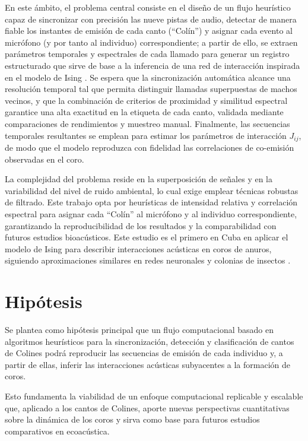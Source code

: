 En este ámbito, el problema central consiste en el diseño de 
un flujo heurístico 
capaz de sincronizar con precisión las nueve pistas de audio, 
detectar de manera fiable los instantes de emisión de cada 
canto (“Colín”) y asignar cada evento al micrófono (y por tanto 
al individuo) correspondiente; a partir de ello, se extraen 
parámetros temporales y espectrales de cada llamado para 
generar un registro estructurado que sirve de base a la 
inferencia de una red de interacción inspirada en el modelo de 
Ising \cite{ising1925beitrag}. Se espera que la sincronización 
automática alcance una resolución temporal tal que permita 
distinguir llamadas superpuestas de machos vecinos, y que la 
combinación de criterios de proximidad y similitud espectral 
garantice una alta exactitud en la etiqueta de cada canto, 
validada mediante comparaciones de rendimientos y muestreo manual. Finalmente, las secuencias 
temporales resultantes se emplean para estimar los parámetros 
de interacción \(J_{ij}\), de modo que el modelo reproduzca 
con fidelidad las correlaciones de co-emisión observadas en el 
coro.  


La complejidad del problema reside en la superposición de 
señales y en la variabilidad del nivel de ruido ambiental, lo 
cual exige emplear técnicas robustas de filtrado. 
Este trabajo opta por heurísticas 
de intensidad relativa y correlación espectral para asignar cada “Colín” al micrófono y 
al individuo correspondiente, garantizando 
la reproducibilidad de los resultados y la comparabilidad con 
futuros estudios bioacústicos. Este estudio es el primero en 
Cuba en aplicar el modelo de Ising para describir 
interacciones acústicas en coros de anuros, siguiendo 
aproximaciones similares en redes 
neuronales y colonias de insectos \cite{schneidman2006weak,mora2011biological,bialek2012biophysics,reyes2019transmission,ising1925beitrag}.

\section{Hipótesis}
\label{sec:hipotesis}

Se plantea como hipótesis principal que un flujo computacional 
basado en algoritmos heurísticos para la sincronización, 
detección y clasificación de cantos de Colines podrá reproducir 
las secuencias de emisión de cada individuo 
y, a partir de ellas, inferir las interacciones acústicas 
subyacentes a la formación de coros. 


Esto fundamenta la 
viabilidad de un enfoque computacional replicable y escalable 
que, aplicado a los cantos de Colines, aporte 
nuevas perspectivas cuantitativas sobre la dinámica de los coros 
y sirva como base para futuros estudios comparativos en 
ecoacústica.  



